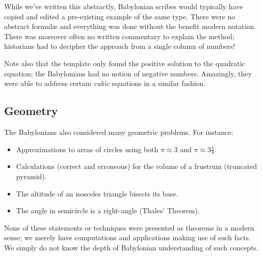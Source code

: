 While we've written this abstractly, Babylonian scribes would typically have copied and edited a pre-existing example of the same type. There were no abstract formulæ and everything was done without the benefit modern notation. There was moreover often no written commentary to explain the method; historians had to decipher the approach from a single column of numbers!
\medbreak

Note also that the template only found the positive solution to the quadratic equation; the Babylonians had no notion of negative numbers. Amazingly, they were able to address certain \emph{cubic} equations in a similar fashion.



\subsection*{Geometry}

The Babylonians also considered many geometric problems. For instance:
\begin{itemize}
  \item Approximations to areas of circles using both $\pi\approx 3$ and $\pi\approx 3\frac 18$.
  \item Calculations (correct and erroneous) for the volume of a frustrum (truncated pyramid).
  \item The altitude of an isosceles triangle bisects its base.
  \item The angle in semicircle is a right-angle (Thales' Theorem). 
\end{itemize}
None of these statements or techniques were presented as theorems in a modern sense; we merely have computations and applications making use of such facts. We simply do not know the depth of Babylonian understanding of such concepts.


\pagebreak[3]


% 



